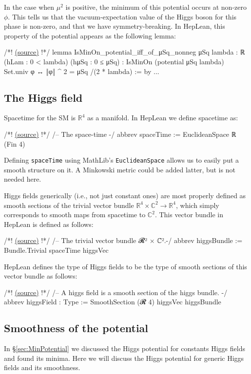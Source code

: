 \documentclass[a4paper, 11pt]{article}
\newcommand{\codeLink}[1]{
  \vspace{-0.5cm}\hfill\href{https://github.com/HEPLean/HepLean/blob/1b951994ae3d882242b02d23957ef1ee7fa05f3d/HepLean/#1}{(source)}
  }
\begin{document}
In the case when $\mu^2$ is positive, the minimum of this potential occurs at non-zero $\phi$. This tells us that the vacuum-expectation value of the Higgs boson for this phase is non-zero, and that we have symmetry-breaking. In HepLean, this property of the potential appears as the following lemma:
\begin{code}
 /*!\codeLink{StandardModel/HiggsField.lean\#L250}!*/
lemma IsMinOn_potential_iff_of_μSq_nonneg {μSq lambda : ℝ} 
    (hLam : 0 < lambda) (hμSq : 0 ≤ μSq) :
    IsMinOn (potential μSq lambda) Set.univ φ ↔ ‖φ‖ ^ 2 = μSq /(2 * lambda) := by
   ...
\end{code}
 
\subsection{The Higgs field}
Spacetime for the SM is $\mathbb{R}^4$ as a manifold. In HepLean we define spacetime as:
\begin{code}
 /*!\codeLink{StandardModel/Basic.lean\#L25}!*/
/-- The space-time -/
abbrev spaceTime := EuclideanSpace ℝ (Fin 4)
\end{code}
Defining \lstinline|spaceTime| using MathLib's \lstinline|EuclideanSpace| allows us to easily put a smooth structure on it. A Minkowski metric could be added latter, but is not needed here. 

Higgs fields generically (i.e., not just constant ones) are most properly defined as smooth sections of the trivial vector bundle $\mathbb{R}^4 \times \mathbb{C}^2 \to \mathbb{R}^4$, which simply corresponds to smooth maps from spacetime to $\mathbb{C}^2$. This vector bundle in HepLean  is defined as follows:
\begin{code}
 /*!\codeLink{StandardModel/HiggsField.lean\#L42}!*/
/-- The trivial vector bundle 𝓡² × ℂ².-/
abbrev higgsBundle := Bundle.Trivial spaceTime higgsVec
\end{code}

HepLean defines the type of Higgs fields to be the type of smooth sections of this vector bundle as follows: 
\begin{code}
 /*!\codeLink{StandardModel/HiggsField.lean\#L48}!*/
/-- A higgs field is a smooth section of the higgs bundle. -/
abbrev higgsField : Type := SmoothSection (𝓡 4) higgsVec higgsBundle
\end{code}

\subsection{Smoothness of the potential}
In \S\ref{sec:MinPotential} we discussed the Higgs potential for constants Higgs fields and found its minima. Here we will discuss the Higgs potential for generic Higgs fields and its smoothness. 
\end{document}
